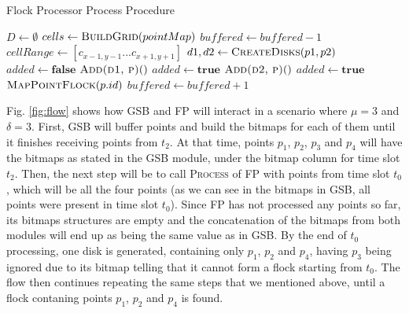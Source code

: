 \begin{algorithm}
\caption{Flock Processor Process Procedure}
\begin{algorithmic}[1]
        \State $D \gets \emptyset$
        \State $cells \gets \Call{BuildGrid}{pointMap}$
            \State {}
            \State $buffered \gets buffered - 1$
        \EndIf
            \State $cellRange \gets [c_{x - 1, y - 1}...c_{x + 1, y+ 1}]$
                        \State $d1, d2 \gets \Call{CreateDisks}{p1, p2}$
                            \State $added \gets \textbf{false}$
                                \State $\Call{Add(d1, p)}$
                                \State $added \gets \textbf{true}$
                            \EndIf
                                \State $\Call{Add(d2, p)}$
                                \State $added \gets \textbf{true}$
                            \EndIf
                                \State $\Call{MapPointFlock}{p.id}$
                            \EndIf
                        \EndFor
                        \State {}
                        \State {}
                    \EndIf
                \EndFor
            \EndFor
        \EndFor
        \State $buffered \gets buffered + 1$
    \EndProcedure
\end{algorithmic}
\end{algorithm}

Fig. \ref{fig:flow} shows how GSB and FP will interact in a scenario where $\mu = 3$ and $\delta = 3$. First, GSB will
buffer points and build the bitmaps for each of them until it finishes receiving points from $t_2$. At that time, points
$p_1$, $p_2$, $p_3$ and $p_4$ will have the bitmaps as stated in the GSB module, under the bitmap column for time slot
$t_2$. Then, the next step will be to call \textsc{Process} of FP with points from time slot $t_0$, which will be all
the four points (as we can see in the bitmaps in GSB, all points were present in time slot $t_0$). Since FP has not
processed any points so far, its bitmaps structures are empty and the concatenation of the bitmaps from both modules
will end up as being the same value as in GSB. By the end of $t_0$ processing, one disk is generated, containing only
$p_1$, $p_2$ and $p_4$, having $p_3$ being ignored due to its bitmap telling that it cannot form a flock starting from
$t_0$. The flow then continues repeating the same steps that we mentioned above, until a flock contaning points $p_1$,
$p_2$ and $p_4$ is found.

